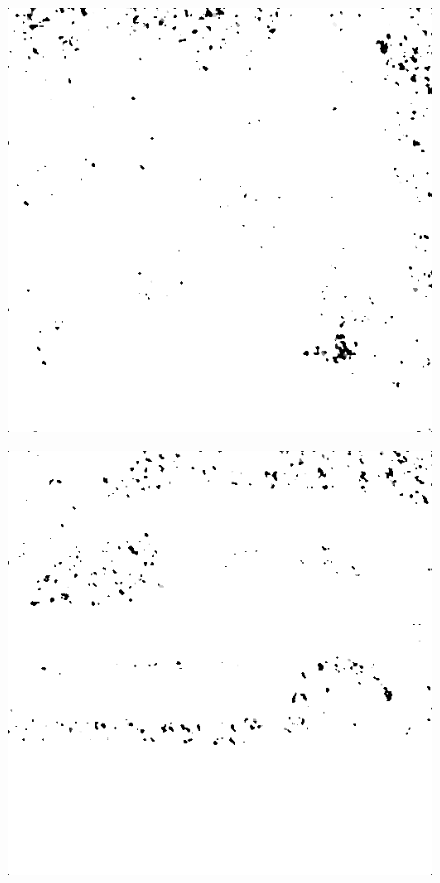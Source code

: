 \begin{figure}[H]
\begin{minipage}[t]{0.3\linewidth}
	\subcaption{}
	\label{fig:hus_m15}
\end{minipage}
\begin{minipage}[t]{0.3\linewidth} %
	\includegraphics[width = 1\linewidth]{gfx/sit/sit_m15.png}
	\subcaption{}
	\label{fig:sit_m15}
\end{minipage}
\begin{minipage}[t]{0.3\linewidth} %
	\includegraphics[width = 1\linewidth]{gfx/car/car_m20.png}

\end{minipage}
\end{figure}
